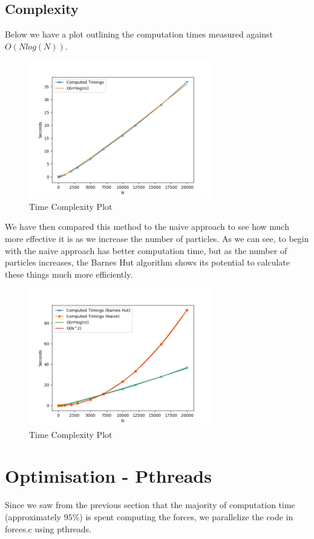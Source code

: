 \documentclass{article}
\begin{document}
\subsection{Complexity}
Below we have a plot outlining the computation times measured against $O(Nlog(N))$.\vspace{0.3cm}
\begin{figure}[htb]
\begin{center}
\includegraphics[width=8cm]{images/nlogn.jpg}
\caption{Time Complexity Plot}
\end{center}
\end{figure}

We have then compared this method to the naive approach to see how much more effective it is as we increase the number of particles. As we can see, to begin with the naive approach has better computation time, but as the number of particles increases, the Barnes Hut algorithm shows its potential to calculate these things much more efficiently.
\begin{figure}[htb]
\begin{center}
\includegraphics[width=8cm]{images/complexity_compare.png}
\caption{Time Complexity Plot}
\end{center}
\end{figure}
\newpage
\section{Optimisation - Pthreads}
Since we saw from the previous section that the majority of computation time (approximately $95\%$) is spent computing the forces, we parallelize the code in forces.c using pthreads.\vspace{0.3cm}
\end{document}
